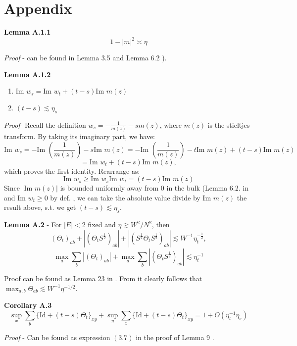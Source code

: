 \documentclass[11pt]{article}
\newenvironment{boxt}[1]
  {\begin{mdframed}\noindent\textbf{#1}\normalfont\space}
  {\end{mdframed}}
\newcommand{\im}{\text{Im }}
\begin{document}
\newpage




\section{Appendix}
\label{sec:appendix}

\begin{boxt}{Lemma A.1.1} \label{lemma-a11} $$ 1-|m|^2 \asymp \eta$$ 
\end{boxt}
\textit{Proof} - can be found in Lemma 3.5 \cite{21} and Lemma 6.2 \cite{dynamic}). 

\begin{boxt}{Lemma A.1.2} \label{lemma-a12} 
\begin{enumerate}
\item $ \im w_s = \im w_t + (t-s)\im m(z)$ 
\item $(t-s)\lesssim \eta_s $
\end{enumerate}

\end{boxt}
\textit{Proof}- Recall the definition $w_s = -\frac{1}{m(z)} - sm(z)$, where $m(z)$ is the stieltjes transform. By taking its imaginary part, we have: $$\im w_s = -\im \left( \frac{1}{m(z)}\right)-s\im m(z)= -\im \left( \frac{1}{m(z)}\right)-t\im m(z) + (t-s)\im m(z)$$
$$=\im w_t + (t-s)\im m(z),$$
which proves the first identity. Rearrange as: 
$$\im w_s\geq \im w_s\im w_t= (t-s)\im m(z)$$
Since $|\im m(z)|$ is bounded uniformly away from $0$ in the bulk (Lemma 6.2. in \cite{dynamic} and $\im w_t\geq 0$ by def. , we can take the absolute value divide by $\im m(z)$ the result above, s.t. we get $(t-s)\lesssim \eta_s$. 

\begin{boxt}{Lemma A.2} \label{lemma-a2} -
 For $|E|<2$ fixed and $\eta\gtrsim W^2/N^2$, then $$(\Theta_t)_{ab} + |(\Theta_tS^{\frac{1}{2}})_{ab}| + |\left(S^{\frac{1}{2}}\Theta_t S^{\frac{1}{2}}\right)_{ab}|\lesssim W^{-1}\eta_t^{-\frac{1}{2}}, $$
 $$\max_a \sum_b |(\Theta_t)_{ab}|+\max_a \sum_b |(\Theta_tS^{\frac{1}{2}})_{ab}|\lesssim \eta_t^{-1}$$
\end{boxt}
Proof can be found as Lemma 23 in \cite{bandSDE}. From it clearly follows that $\max_{a,b}\Theta_{ab} \lesssim W^{-1}\eta^{-1/2}$. 

\begin{boxt}{Corollary A.3} \label{cor-a3} 
$$\sup_x \sum_y \{\text{Id}+(t-s)\Theta_t\}_{xy} + \sup_y \sum_x \{\text{Id} + (t-s)\Theta_t\}_{xy} = 1+O(\eta_t^{-1}\eta_s)$$
 \end{boxt}
 \textit{Proof} - Can be found as expression $(3.7)$ in the proof of Lemma 9 \cite{bandSDE}. 
\end{document}
